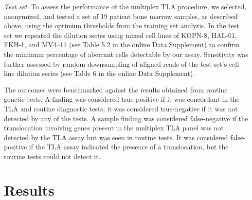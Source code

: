 \textsl{Test set}. To assess the performance of the multiplex TLA procedure, we selected, anonymized, and tested a set of 19 patient bone marrow samples, as described above, using the optimum thresholds from the training set analysis. 
In the test set we repeated the dilution series using mixed cell lines of KOPN-8, HAL-01, FKH-1, and MV4–11 (see Table 5.2 in the online Data Supplement) to confirm the minimum percentage of aberrant cells detectable by our assay.  Sensitivity was further assessed by random downsampling of aligned reads of the test set’s cell line dilution series (see Table 6 in the online Data Supplement). 

The outcomes were benchmarked against the results obtained from routine genetic tests.
A finding was considered true-positive if it was concordant in the TLA and routine diagnostic tests; it was considered true-negative if it was not detected by any of the tests. 
A sample finding was considered false-negative if the translocation involving genes present in the multiplex TLA panel was not detected by the TLA assay but was seen in routine tests. 
It was considered false-positive if the TLA assay indicated the presence of a translocation, but the routine tests could not detect it.


\section{Results}\label{results}

